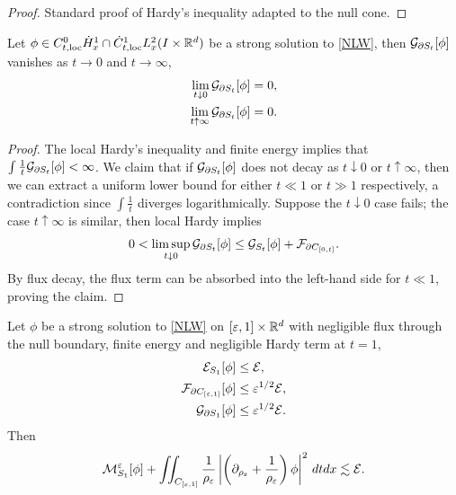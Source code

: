 \begin{proof}
	Standard proof of Hardy's inequality adapted to the null cone. 
\end{proof}

\begin{corollary}
	Let $\phi \in C^0_{t, \mathrm{loc}} \dot H^1_x \cap \dot C^1_{t, \mathrm{loc}} L^2_x (I \times \mathbb R^d)$ be a strong solution to \eqref{NLW}, then $\mathcal G_{\partial S_t} [\phi]$ vanishes as $t \to 0$ and $t \to \infty$,
		\begin{align*}
			\lim_{t \downarrow 0}\mathcal G_{\partial S_t} [\phi]
				&= 0, \\
			\lim_{t \uparrow \infty}\mathcal G_{\partial S_t} [\phi]
				&= 0.	
		\end{align*}	
\end{corollary}

\begin{proof}
	The local Hardy's inequality and finite energy implies that $\int \tfrac1t \mathcal G_{\partial S_t} [\phi] < \infty$. We claim that if $\mathcal G_{\partial S_t} [\phi]$ does not decay as $t\downarrow 0$ or $t\uparrow \infty$, then we can extract a uniform lower bound for either $t \ll 1$ or $t \gg 1$ respectively, a contradiction since $\int \tfrac1t$ diverges logarithmically. Suppose the $t \downarrow 0$ case fails; the case $t \uparrow \infty$ is similar, then local Hardy implies
		\[
			0 < \limsup_{t \downarrow 0} \mathcal G_{\partial S_t} [\phi] \leq \mathcal G_{S_t} [\phi] + \mathcal F_{\partial C_{[0, t]}}.
		\]
	By flux decay, the flux term can be absorbed into the left-hand side for $t \ll 1$, proving the claim. 
\end{proof}

\begin{theorem}\label{thm:monotone1}
	Let $\phi$ be a strong solution to \eqref{NLW} on $[\varepsilon, 1] \times \mathbb R^d$ with negligible flux through the null boundary, finite energy and negligible Hardy term at $t = 1$, 
	\begin{align*}
		\mathcal E_{S_1} [\phi]
			&\leq \mathcal E, \\
		\mathcal F_{\partial C_{[\varepsilon, 1]}} [\phi]
			&\leq \varepsilon^{1/2} \mathcal E, \\
		\mathcal G_{\partial S_1}[\phi]
			&\leq \varepsilon^{1/2}\mathcal E.
	\end{align*} 
	Then
		\[
			\mathcal M_{S_{1}}^\varepsilon [\phi] + \iint_{C_{[\varepsilon, 1]}} \frac1{\rho_\varepsilon} \left| \left( \partial_{\rho_\varepsilon} + \frac1{\rho_\varepsilon} \right) \phi\right|^2 \, dt dx \lesssim \mathcal E.
		\]	
\end{theorem}

